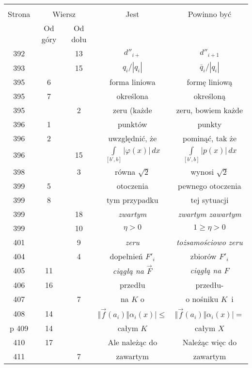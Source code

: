 \documentclass[a4paper,11pt]{article}
\numberwithin{equation}{section}
\begin{document}
\begin{center}
  \begin{tabular}{|c|c|c|c|c|}
    \hline
    & \multicolumn{2}{c|}{} & & \\
    Strona & \multicolumn{2}{c|}{Wiersz} & Jest
                              & Powinno być \\ \cline{2-3}
    & Od góry & Od dołu & & \\
    \hline
    392 & & 13 & $d''_{ i + }$ & $d''_{ i + 1 }$ \\
    393 & & 15 & $q_{ i } / | q_{ i } |$ & $\bar{ q }_{ i } / | q_{ i } |$ \\
    395 &  6 & & forma liniowa & formę liniową \\
    395 &  7 & & określona & określoną \\
    395 & &  2 & zeru (każde & zeru, bowiem każde \\
    396 &  1 & & punktów & punkty \\
    396 &  2 & & uwzględnić, że & pominąć, tak że \\
    396 & & 15 & $\int\limits_{ [ b', b ] } | \varphi( x ) | \, dx$
           & $\int\limits_{ [ b', b ] } | p( x ) | \, dx$ \\
    398 & &  3 & równa $\sqrt{ 2 }$ & wynosi $\sqrt{ 2 }$ \\
    399 &  5 & & otoczenia & pewnego otoczenia \\
    399 &  8 & & tym przypadku & tej sytuacji \\
    399 & & 18 & \textit{zwartym} & \textit{zwartym zawartym} \\
    399 & & 10 & $\eta > 0$ & $1 \geq \eta > 0$ \\
    401 & &  9 & \textit{zeru} & \textit{tożsamościowo zeru} \\
    404 & &  4 & dopełnień $F'_{ i }$ & zbiorów $F'_{ i }$ \\
    405 & 11 & & \textit{ciągłą na $\vec{ F }$} & \textit{ciągłą na $F$} \\
    406 & 16 & & przedłu & przedłu- \\
    407 & &  7 & na $K$ o & o nośniku $K$~i \\
    408 & 14 & & $\Vert \vec{ f }( a_{ i } ) \Vert \alpha_{ i }( x ) \big| \leq$
           & $\Vert \vec{ f }( a_{ i } ) \Vert \alpha_{ i }( x ) \big| =$ \\p
    409 & 14 & & całym $K$ & całym $X$ \\
    410 & 17 & & Ale należąc do & Należąc więc do \\
    411 & &  7 & zawartym & zawartym \\

\end{tabular}
\end{center}
\end{document}
